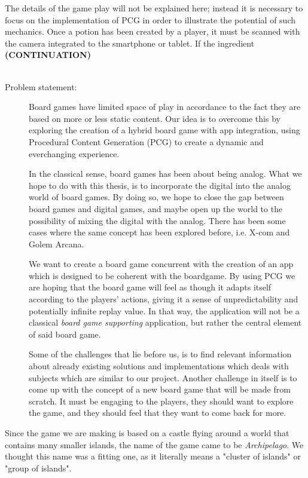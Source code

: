 The details of the game play will not be explained here; instead it is necessary to focus on the implementation of PCG in order to illustrate the potential of such mechanics. Once a potion has been created by a player, it must be scanned with the camera integrated to the smartphone or tablet. If the ingredient \textbf{(CONTINUATION)}\\\\

\begin{description}
\item[Problem statement:]
Board games have limited space of play in accordance to the fact they are based on more or less static content. Our idea is to overcome this by exploring the creation of a hybrid board game  with app integration, using Procedural Content Generation (PCG) to create a dynamic and everchanging experience.

In the classical sense, board games has been about being analog. What we hope to do with this thesis, is to incorporate the digital into the analog world of board games. By doing so, we hope to close the gap between board games and digital games, and maybe open up the world to the possibility of mixing the digital with the analog. There has been some cases where the same concept has been explored before, i.e. X-com and Golem Arcana.

We want to create a board game concurrent with the creation of an app which is designed to be coherent with the boardgame. By using PCG we are hoping that the board game will feel as though it adapts itself according to the players' actions, giving it a sense of unpredictability and potentially infinite replay value. In that way, the application will not be a classical \textit{board game supporting} application, but rather the central element of said board game.

Some of the challenges that lie before us, is to find relevant information about already existing solutions and implementations which deals with subjects which are similar to our project.
Another challenge in itself is to come up with the concept of a new board game that will be made from scratch. It must be engaging to the players, they should want to explore the game, and they should feel that they want to come back for more.
\end{description}

Since the game we are making is based on a castle flying around a world that contains many smaller islands, the name of the game came to be \textit{Archipelago}.
We thought this name was a fitting one, as it literally means a "cluster of islands" or "group of islands".


